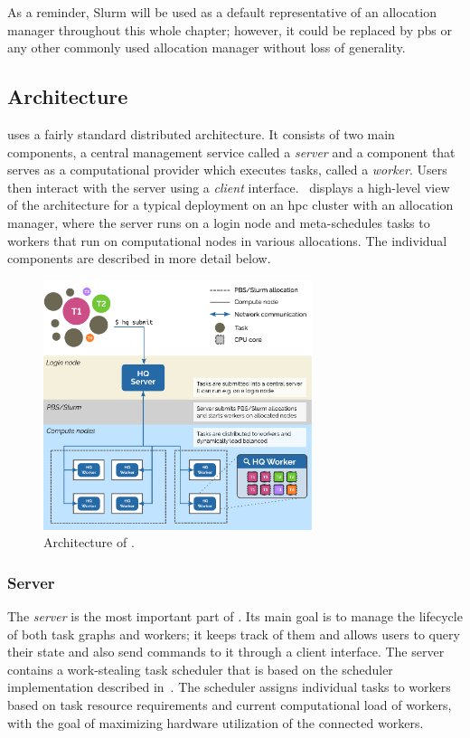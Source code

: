 As a reminder, Slurm will be used as a default representative of an allocation manager throughout
this whole chapter; however, it could be replaced by \gls{pbs} or any other commonly
used allocation manager without loss of generality.

\subsection{Architecture}
\label{hq:architecture}
\hyperqueue{} uses a fairly standard distributed architecture. It consists of two main
components, a central management service called a \emph{server} and a component that
serves as a computational provider which executes tasks, called a \emph{worker}. Users
then interact with the server using a \emph{client} interface.~
displays a high-level view of the \hq{} architecture for a typical deployment on
an \gls{hpc} cluster with an allocation manager, where the server runs on a login
node and meta-schedules tasks to workers that run on computational nodes in various allocations.
The individual components are described in more detail below.

\begin{figure}[h]
	\centering
	\includegraphics[width=0.7\textwidth]{imgs/hq/architecture}
	\caption{Architecture of \hyperqueue{}.}
	\label{fig:hq-architecture}
\end{figure}

\subsubsection*{Server}
The \emph{server} is the most important part of \hyperqueue{}. Its main goal is
to manage the lifecycle of both task graphs and workers; it keeps track of them and allows users to
query their state and also send commands to it through a client interface. The server contains a
work-stealing task scheduler that is based on the \rsds{} scheduler implementation
described in~. The scheduler assigns individual tasks to workers based on
task resource requirements and current computational load of workers, with the goal of maximizing
hardware utilization of the connected workers.

